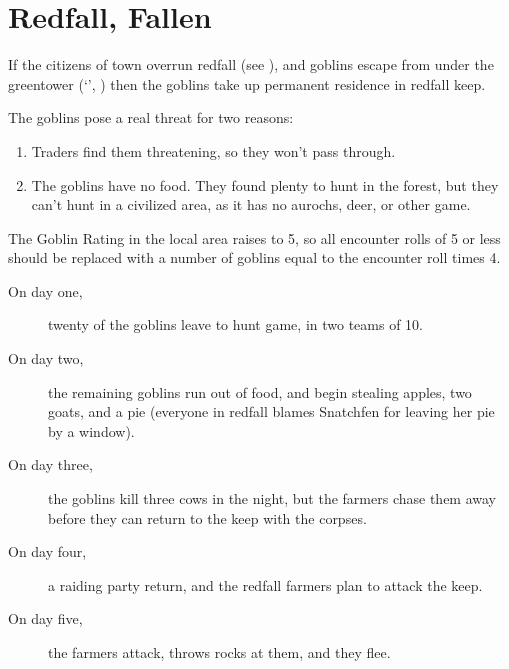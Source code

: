 \section{Redfall, Fallen}
\label{redfallFallen}

%

\begin{multicols}{2}

\noindent
If the citizens of \gls{town} overrun \gls{redfall} (see ), and goblins escape from under the \gls{greentower} (`', ) then the goblins take up permanent residence in \gls{redfall} keep.

The goblins pose a real threat for two reasons:

\begin{enumerate}
  \item
  Traders find them threatening, so they won't pass through.
  \item
  The goblins have no food.
  They found plenty to hunt in the forest, but they can't hunt in a civilized area, as it has no aurochs, deer, or other game.
\end{enumerate}

The Goblin Rating in the local area raises to 5, so all encounter rolls of 5 or less should be replaced with a number of goblins equal to the encounter roll times 4.%

\begin{description}
  \item[On day one,]
  twenty of the goblins leave to hunt game, in two teams of 10.

  \item[On day two,]
  the remaining goblins run out of food, and begin stealing apples, two goats, and a pie (everyone in \gls{redfall} blames Snatchfen for leaving her pie by a window).

  \item[On day three,]
  the goblins kill three cows in the night, but the farmers chase them away before they can return to the keep with the corpses.

  \item[On day four,]
  a raiding party return, and the \gls{redfall} farmers plan to attack the keep.

  \item[On day five,]
  the farmers attack,  throws rocks at them, and they flee.


\end{description}
\end{multicols}
